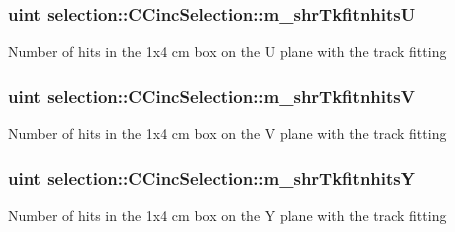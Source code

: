 \subsubsection[{\texorpdfstring{m\+\_\+shr\+TkfitnhitsU}{m_shrTkfitnhitsU}}]{\setlength{\rightskip}{0pt plus 5cm}uint selection\+::\+C\+Cinc\+Selection\+::m\+\_\+shr\+TkfitnhitsU\hspace{0.3cm}{\ttfamily [private]}}\hypertarget{classselection_1_1CCincSelection_a3617f2e35ecc3cd9ceb53108b4c288cb}{}\label{classselection_1_1CCincSelection_a3617f2e35ecc3cd9ceb53108b4c288cb}
Number of hits in the 1x4 cm box on the U plane with the track fitting 
\subsubsection[{\texorpdfstring{m\+\_\+shr\+TkfitnhitsV}{m_shrTkfitnhitsV}}]{\setlength{\rightskip}{0pt plus 5cm}uint selection\+::\+C\+Cinc\+Selection\+::m\+\_\+shr\+TkfitnhitsV\hspace{0.3cm}{\ttfamily [private]}}\hypertarget{classselection_1_1CCincSelection_a8ad70697906b08285a218c739e8c4815}{}\label{classselection_1_1CCincSelection_a8ad70697906b08285a218c739e8c4815}
Number of hits in the 1x4 cm box on the V plane with the track fitting 
\subsubsection[{\texorpdfstring{m\+\_\+shr\+TkfitnhitsY}{m_shrTkfitnhitsY}}]{\setlength{\rightskip}{0pt plus 5cm}uint selection\+::\+C\+Cinc\+Selection\+::m\+\_\+shr\+TkfitnhitsY\hspace{0.3cm}{\ttfamily [private]}}\hypertarget{classselection_1_1CCincSelection_a63f55e51e3df0e108aace93b3c34c153}{}\label{classselection_1_1CCincSelection_a63f55e51e3df0e108aace93b3c34c153}
Number of hits in the 1x4 cm box on the Y plane with the track fitting 
